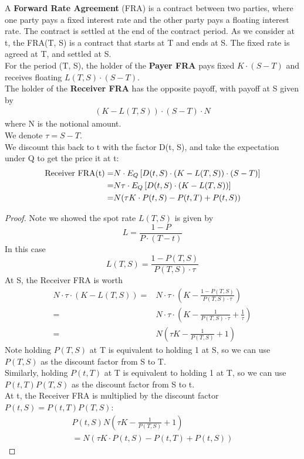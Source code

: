 \begin{definition}
    A \textbf{Forward Rate Agreement} (FRA) is a contract between two parties, where one party pays a fixed interest rate and the other party pays a floating interest rate. The contract is settled at the end of the contract period.
    As we consider at t, the FRA(T, S) is a contract that starts at T and ends at S. The fixed rate is agreed at T, and settled at S. \\
    For the period (T, S), the holder of the \textbf{Payer FRA} pays fixed $K \cdot (S - T)$ and receives floating $L(T, S) \cdot (S - T)$. \\
    The holder of the \textbf{Receiver FRA} has the opposite payoff, with payoff at S given by
    \begin{align*}
        (K - L(T, S)) \cdot (S - T) \cdot N
    \end{align*}
    where N is the notional amount.\\
    We denote $\tau = S - T$.\\
    We discount this back to t with the factor D(t, S), and take the expectation under Q to get the price it at t:
    \begin{align}
        \text{Receiver FRA(t)} =& N \cdot E_Q\left[ D(t, S) \cdot (K - L(T, S)) \cdot (S - T) \right] \notag \\
        =& N \tau \cdot E_Q\left[ D(t, S) \cdot (K - L(T, S)) \right]\\
        =& N (\tau K \cdot P(t, S) - P(t, T) + P(t, S)) 
    \end{align}
\end{definition}
    \begin{proof}
    Note we showed the spot rate $L(T, S)$ is given by
    $$
        L = \frac{1 - P}{P \cdot (T - t)}
    $$
    In this case
    $$
        L(T, S) = \frac{1 - P(T, S)}{P(T, S) \cdot \tau}
    $$
    At S, the Receiver FRA is worth 
    \begin{align*}
        N \cdot \tau \cdot (K - L(T, S))  
        =& N \cdot \tau \cdot (K - \frac{1 - P(T, S)}{P(T, S) \cdot \tau}) \\
        =& N \cdot \tau \cdot (K - \frac{1}{P(T, S) \cdot \tau} + \frac{1}{\tau}) \\
        =& N (\tau K - \frac{1}{P(T, S)} + 1)
    \end{align*}
    Note holding $P(T, S)$ at T is equivalent to holding 1 at S, so we can use $P(T, S)$ as the discount factor from S to T.\\
    Similarly, holding $P(t, T)$ at T is equivalent to holding 1 at T, so we can use $P(t, T) P(T, S)$ as the discount factor from S to t.\\
    At t, the Receiver FRA is multiplied by the discount factor $P(t, S) = P(t, T) P(T, S)$:
    \begin{align*}
        P(t, S) N (\tau K - \frac{1}{P(T, S)} + 1) \\
        = N (\tau K \cdot P(t, S) - P(t, T) + P(t, S)) 
    \end{align*}
\end{proof}

